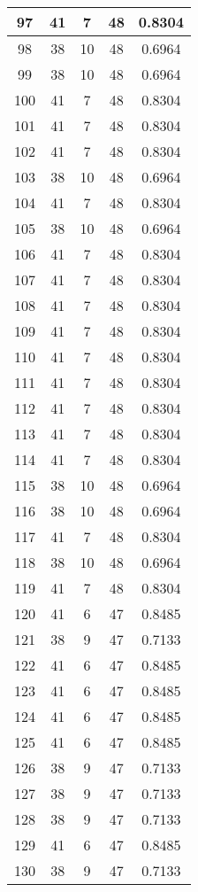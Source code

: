\documentclass[letterpaper, 12pt]{article}
\begin{document}
\begin{longtable}{|c|c|c|c|c|}
\hline
97 & 41 & 7 & 48 & 0.8304 \\
\hline
98 & 38 & 10 & 48 & 0.6964 \\
\hline
99 & 38 & 10 & 48 & 0.6964 \\
\hline
100 & 41 & 7 & 48 & 0.8304 \\
\hline
101 & 41 & 7 & 48 & 0.8304 \\
\hline
102 & 41 & 7 & 48 & 0.8304 \\
\hline
103 & 38 & 10 & 48 & 0.6964 \\
\hline
104 & 41 & 7 & 48 & 0.8304 \\
\hline
105 & 38 & 10 & 48 & 0.6964 \\
\hline
106 & 41 & 7 & 48 & 0.8304 \\
\hline
107 & 41 & 7 & 48 & 0.8304 \\
\hline
108 & 41 & 7 & 48 & 0.8304 \\
\hline
109 & 41 & 7 & 48 & 0.8304 \\
\hline
110 & 41 & 7 & 48 & 0.8304 \\
\hline
111 & 41 & 7 & 48 & 0.8304 \\
\hline
112 & 41 & 7 & 48 & 0.8304 \\
\hline
113 & 41 & 7 & 48 & 0.8304 \\
\hline
114 & 41 & 7 & 48 & 0.8304 \\
\hline
115 & 38 & 10 & 48 & 0.6964 \\
\hline
116 & 38 & 10 & 48 & 0.6964 \\
\hline
117 & 41 & 7 & 48 & 0.8304 \\
\hline
118 & 38 & 10 & 48 & 0.6964 \\
\hline
119 & 41 & 7 & 48 & 0.8304 \\
\hline
120 & 41 & 6 & 47 & 0.8485 \\
\hline
121 & 38 & 9 & 47 & 0.7133 \\
\hline
122 & 41 & 6 & 47 & 0.8485 \\
\hline
123 & 41 & 6 & 47 & 0.8485 \\
\hline
124 & 41 & 6 & 47 & 0.8485 \\
\hline
125 & 41 & 6 & 47 & 0.8485 \\
\hline
126 & 38 & 9 & 47 & 0.7133 \\
\hline
127 & 38 & 9 & 47 & 0.7133 \\
\hline
128 & 38 & 9 & 47 & 0.7133 \\
\hline
129 & 41 & 6 & 47 & 0.8485 \\
\hline
130 & 38 & 9 & 47 & 0.7133 \\

\end{longtable}
\end{document}
